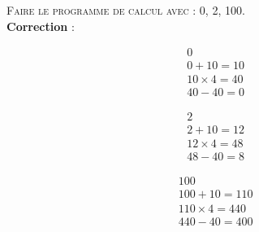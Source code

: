 \documentclass[11pt]{article}
\begin{document}
\textsc{Faire le programme de calcul avec : 0, 2, 100.} \\

\textbf{Correction} :

\begin{minipage}{0.3\textwidth}

\begin{align*}
& 0 \\
& 0 + 10 = 10 \\
& 10 \times 4 = 40\\
& 40 - 40 = 0
\end{align*}

\end{minipage}\begin{minipage}{0.3\textwidth}

\begin{align*}
& 2 \\
& 2 + 10 = 12 \\
& 12 \times 4 = 48\\
& 48 - 40 = 8
\end{align*}

\end{minipage}\begin{minipage}{0.3\textwidth}

\begin{align*}
& 100 \\
& 100 + 10 = 110 \\
& 110 \times 4 = 440\\
& 440 - 40 = 400
\end{align*}

\end{minipage}
\end{document}
